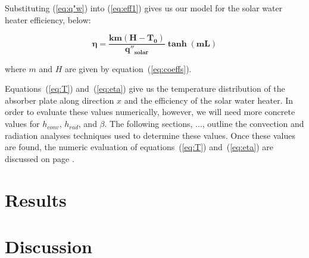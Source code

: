 \documentclass[]{article}
\begin{document}
Substituting (\ref{eq:q"w}) into (\ref{eq:eff1}) gives us our model for the solar water heater efficiency, below:

\begin{equation} \label{eq:eta}
\boldsymbol{\eta = \frac{km(H-T_0)}{q''_{solar}}\tanh(mL)}
\end{equation}

where $m$ and $H$ are given by equation~(\ref{eq:coeffs}).

Equations~(\ref{eq:T}) and~(\ref{eq:eta}) give us the temperature distribution of the absorber plate along direction $x$ and the efficiency of the solar water heater. In order to evaluate these values numerically, however, we will need more concrete values for $h_{conv}$, $h_{rad}$, and $\beta$. The following sections, ..., outline the convection and radiation analyses techniques used to determine these values. Once these values are found, the numeric evaluation of equations~(\ref{eq:T}) and~(\ref{eq:eta}) are discussed on page \pageref{Results}.



\section{Results} \label{Results}

\section{Discussion}
\end{document}
